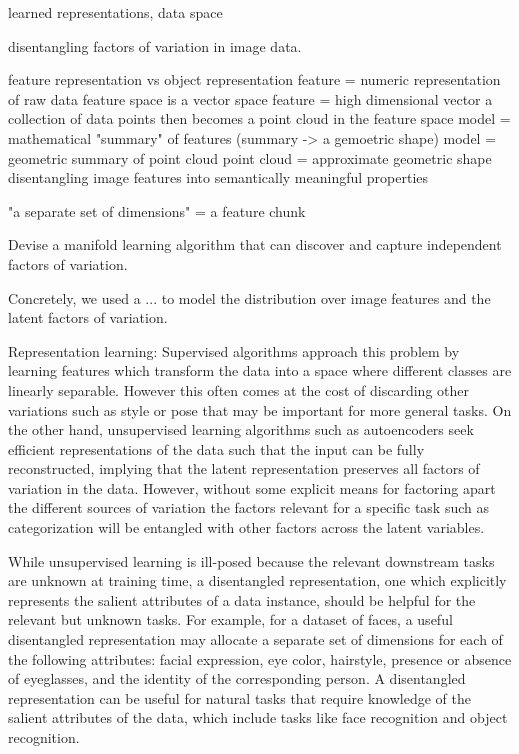 \documentclass[12pt,a4paper]{article}
\begin{document}
learned representations, data space

disentangling factors of variation in image data. 

feature representation vs object representation
feature = numeric representation of raw data
feature space is a vector space
feature = high dimensional vector
a collection of data points then becomes a point cloud in the feature space 
model = mathematical "summary" of features (summary -> a gemoetric shape)
model = geometric summary of point cloud
point cloud = approximate geometric shape
disentangling image features into semantically meaningful properties

"a separate set of dimensions" = a feature chunk

Devise a manifold learning algorithm that can discover and capture independent factors of variation.

\par Concretely, we used a ... to model the distribution over image features and the latent factors of variation.

Representation learning: Supervised algorithms approach this problem by learning features which transform the data into a space where different classes are linearly separable. However this often comes at the cost of discarding other variations such as style or pose that may be important for more general tasks. On the other hand, unsupervised learning algorithms such as autoencoders seek efficient representations of the data such that the input can be fully reconstructed, implying that the latent representation preserves all factors of variation in the data. However, without some explicit means for factoring apart the different sources of variation the factors relevant for a specific task such as categorization will be entangled with other factors across the latent variables. 

While unsupervised learning is ill-posed because the relevant downstream tasks are unknown at training time, a disentangled representation, one which explicitly represents the salient attributes of a data instance, should be helpful for the relevant but unknown tasks. For example, for a dataset of faces, a useful disentangled representation may allocate a separate set of dimensions for each of the following attributes: facial expression, eye color, hairstyle, presence or absence of eyeglasses, and the identity of the corresponding person. A disentangled representation can be useful for natural tasks that require knowledge of the salient attributes of the data, which include tasks like face recognition and object recognition.
\end{document}
